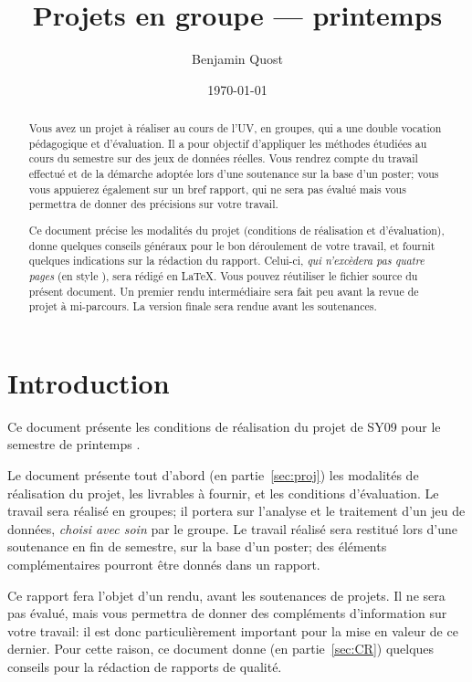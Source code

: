 \documentclass[twocolumn,10pt]{article}
\title{Projets en groupe --- printemps \the\year}
\author{Benjamin Quost}
\date{\today}
\begin{document}
\maketitle %
\thispagestyle{fancy} %

\begin{abstract}

Vous avez un projet à réaliser au cours de l'UV, en groupes, qui a une double vocation pédagogique et d'évaluation. Il a pour objectif d'appliquer les méthodes étudiées au cours du semestre sur des jeux de données réelles. Vous rendrez compte du travail effectué et de la démarche adoptée lors d'une soutenance sur la base d'un poster; vous vous appuierez également sur un bref rapport, qui ne sera pas évalué mais vous permettra de donner des précisions sur votre travail. 

Ce document précise les modalités du projet (conditions de réalisation et d'évaluation), donne quelques conseils généraux pour le bon déroulement de votre travail, et fournit quelques indications sur la rédaction du rapport. 
Celui-ci, \emph{qui n'excèdera pas quatre pages} (en style ), sera rédigé en \LaTeX{}. Vous pouvez réutiliser le fichier source du présent document. Un premier rendu intermédiaire sera fait peu avant la revue de projet à mi-parcours. La version finale sera rendue avant les soutenances. 

\end{abstract}



\section*{Introduction}

Ce document présente les conditions de réalisation du projet de SY09 pour le semestre de printemps \the\year. 

Le document présente tout d'abord (en partie~\ref{sec:proj}) les modalités de réalisation du projet, les livrables à fournir, et les conditions d'évaluation. Le travail sera réalisé en groupes; il portera sur l'analyse et le traitement d'un jeu de données, \emph{choisi avec soin} par le groupe. Le travail réalisé sera restitué lors d'une soutenance en fin de semestre, sur la base d'un poster; des éléments complémentaires pourront être donnés dans un rapport. 

Ce rapport fera l'objet d'un rendu, avant les soutenances de projets. Il ne sera pas évalué, mais vous permettra de donner des compléments d'information sur votre travail: il est donc particulièrement important pour la mise en valeur de ce dernier. 
Pour cette raison, ce document donne (en partie~\ref{sec:CR}) quelques conseils pour la rédaction de rapports de qualité. 
\end{document}
